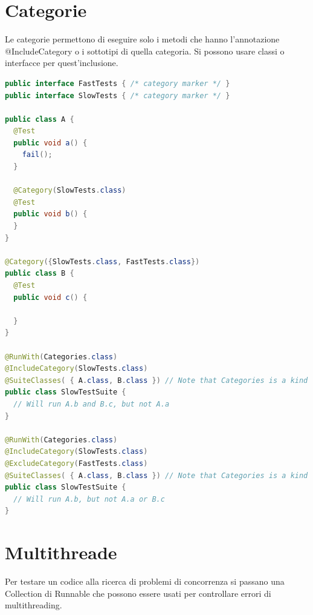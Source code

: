 \documentclass[11pt,a4paper]{book}
\begin{document}
\section{Categorie}
Le categorie permettono di eseguire solo i metodi che hanno l'annotazione @IncludeCategory o i sottotipi di quella categoria. Si possono usare classi o interfacce per quest'inclusione.

\begin{lstlisting}[language = Java]
public interface FastTests { /* category marker */ }
public interface SlowTests { /* category marker */ }

public class A {
  @Test
  public void a() {
    fail();
  }

  @Category(SlowTests.class)
  @Test
  public void b() {
  }
}

@Category({SlowTests.class, FastTests.class})
public class B {
  @Test
  public void c() {

  }
}

@RunWith(Categories.class)
@IncludeCategory(SlowTests.class)
@SuiteClasses( { A.class, B.class }) // Note that Categories is a kind of Suite
public class SlowTestSuite {
  // Will run A.b and B.c, but not A.a
}

@RunWith(Categories.class)
@IncludeCategory(SlowTests.class)
@ExcludeCategory(FastTests.class)
@SuiteClasses( { A.class, B.class }) // Note that Categories is a kind of Suite
public class SlowTestSuite {
  // Will run A.b, but not A.a or B.c
}
\end{lstlisting}

\section{Multithreade}
Per testare un codice alla ricerca di problemi di concorrenza si passano una Collection di Runnable che possono essere usati per controllare errori di multithreading.
\end{document}
